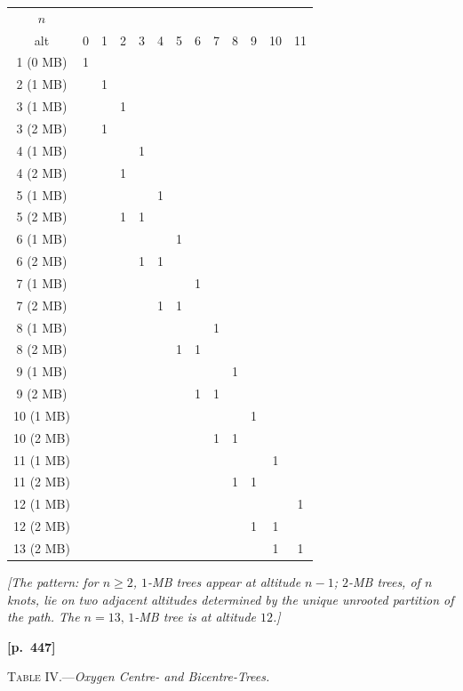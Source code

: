 \documentclass[11pt,a4paper]{article}
\begin{document}
\begin{center}
\begin{tabular}{c|cccccccccccc}
$n$ \\ alt & 0 & 1 & 2 & 3 & 4 & 5 & 6 & 7 & 8 & 9 & 10 & 11\\\hline
1 (0 MB) & 1 & & & & & & & & & & &\\
2 (1 MB) & & 1 & & & & & & & & & &\\
3 (1 MB) & & & 1 & & & & & & & & &\\
3 (2 MB) & & 1 & & & & & & & & & &\\
4 (1 MB) & & & & 1 & & & & & & & &\\
4 (2 MB) & & & 1 & & & & & & & & &\\
5 (1 MB) & & & & & 1 & & & & & & &\\
5 (2 MB) & & & 1 & 1 & & & & & & & &\\
6 (1 MB) & & & & & & 1 & & & & & &\\
6 (2 MB) & & & & 1 & 1 & & & & & & &\\
7 (1 MB) & & & & & & & 1 & & & & &\\
7 (2 MB) & & & & & 1 & 1 & & & & & &\\
8 (1 MB) & & & & & & & & 1 & & & &\\
8 (2 MB) & & & & & & 1 & 1 & & & & &\\
9 (1 MB) & & & & & & & & & 1 & & &\\
9 (2 MB) & & & & & & & 1 & 1 & & & &\\
10 (1 MB) & & & & & & & & & & 1 & &\\
10 (2 MB) & & & & & & & & 1 & 1 & & &\\
11 (1 MB) & & & & & & & & & & & 1 &\\
11 (2 MB) & & & & & & & & & 1 & 1 & &\\
12 (1 MB) & & & & & & & & & & & & 1\\
12 (2 MB) & & & & & & & & & & 1 & 1 &\\
13 (2 MB) & & & & & & & & & & & 1 & 1
\end{tabular}
\end{center}

\noindent\textit{[The pattern: for $n\geq2$, $1$-MB trees appear at altitude $n-1$; $2$-MB trees, of $n$ knots, lie on two adjacent altitudes determined by the unique unrooted partition of the path. The $n=13,\,1$-MB tree is at altitude $12$.]}

\newpage
\noindent\textbf{[p.~447]}\quad
\begin{center}
\textsc{Table IV.}\quad---\quad\textit{Oxygen Centre- and Bicentre-Trees.}
\end{center}
\end{document}
